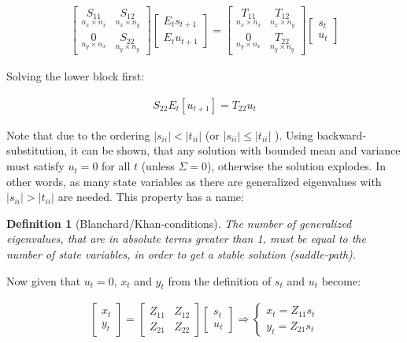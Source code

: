 \documentclass{pracamgr}
\numberwithin{equation}{section}
\newtheorem{mydef}{Definition}
\begin{document}
\begin{align}
\begin{bmatrix} \underset{n_x \times n_x}{S_{11}} & \underset{n_x \times n_y}{S_{12}} \\ \underset{n_y \times n_x}{0} & \underset{n_y \times n_y}{S_{22}}\end{bmatrix} \begin{bmatrix} E_t s_{t+1}\\ E_t u_{t+1} \end{bmatrix} = \begin{bmatrix} \underset{n_x \times n_x}{T_{11}} & \underset{n_x \times n_y}{T_{12}} \\ \underset{n_y \times n_x}{0} & \underset{n_y \times n_y}{T_{22}}\end{bmatrix} \begin{bmatrix} s_t \\ u_t \end{bmatrix}
\end{align}

Solving the lower block first:

\begin{align}
  S_{22} E_t[u_{t+1}] = T_{22} u_t
\end{align}

Note that due to the ordering $|s_{ii}|<|t_{ii}|$ (or $|s_{ii}|\leq|t_{ii}|$ ). Using backward-substitution, it can be shown, that any solution with bounded mean and variance must satisfy $u_t=0$ for all $t$ (unless $\Sigma=0$), otherwise the solution explodes. In other words, as many state variables as there are generalized eigenvalues with $|s_{ii}|>|t_{ii}|$ are needed. This property has a name:

\begin{mydef}[Blanchard/Khan-conditions]
The number of generalized eigenvalues, that are in absolute terms greater than 1, must be equal to the number of state variables, in order to get a stable solution (saddle-path).
\end{mydef}

Now given that $u_t=0$, $x_t$ and $y_t$ from the definition of $s_t$ and $u_t$ become:

\begin{align}
  \begin{bmatrix} x_t \\ y_t \end{bmatrix} = \begin{bmatrix} Z_{11} & Z_{12}\\ Z_{21} & Z_{22} \end{bmatrix} \begin{bmatrix} s_t \\ u_t \end{bmatrix}
  \Rightarrow
  \begin{cases}
    x_t = Z_{11} s_t\\
    y_t = Z_{21} s_t
  \end{cases}
\end{align}
\end{document}
